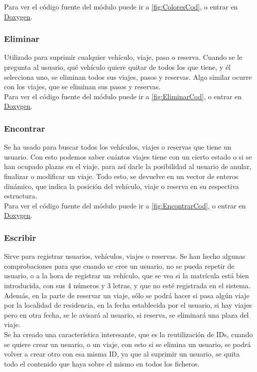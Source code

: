 Para ver el código fuente del módulo puede ir a \ref{fig:ColoresCod}, o entrar en \href{DOC_DOXYGEN/colores_8h_source.html}{Doxygen}.
\label{fig:Colores}

\subsubsection{Eliminar}

Utilizado para suprimir cualquier vehículo, viaje, paso o reserva. Cuando se le pregunta al usuario, qué vehículo quiere quitar de todos los que tiene,
y él selecciona uno, se eliminan todos sus viajes, pasos y reservas. Algo similar ocurre con los viajes, que se eliminan sus pasos y reservas.\\

Para ver el código fuente del módulo puede ir a \ref{fig:EliminarCod}, o entrar en \href{DOC_DOXYGEN/eliminar_8h_source.html}{Doxygen}.
\label{fig:Eliminar}

\subsubsection{Encontrar}

Se ha usado para buscar todos los vehículos, viajes o reservas que tiene un usuario. Con esto podemos saber cuántos viajes
tiene con un cierto estado o si se han ocupado plazas en el viaje, para así darle la posibilidad al usuario de anular, finalizar o modificar un viaje.
Todo esto, se devuelve en un vector de enteros dinámico, que indica la posición del vehículo, viaje o reserva en su respectiva estructura.\\

Para ver el código fuente del módulo puede ir a \ref{fig:EncontrarCod}, o entrar en \href{DOC_DOXYGEN/encontrar_8h_source.html}{Doxygen}.
\label{fig:Encontrar}

\subsubsection{Escribir}

Sirve para registrar usuarios, vehículos, viajes o reservas. Se han hecho algunas comprobaciones para que cuando se cree un usuario, no se pueda repetir de usuario,
o a la hora de registrar un vehículo, que se vea si la matrícula está bien introducida, con sus 4 números y 3 letras, y que no esté registrada en el sistema.
Además, en la parte de reservar un viaje, sólo se podrá hacer si pasa algún viaje por la localidad de residencia, en la fecha establecida por el usuario,
si hay viajes pero en otra fecha, se le avisará al usuario, si reserva, se eliminará una plaza del viaje.\\
Se ha creado una característica interesante, que es la reutilización de IDs, cuando se quiere crear un usuario, o un viaje, con esto si se elimina un usuario,
se podrá volver a crear otro con esa misma ID, ya que al suprimir un usuario, se quita todo el contenido que haya sobre el mismo en todos los ficheros.\\

